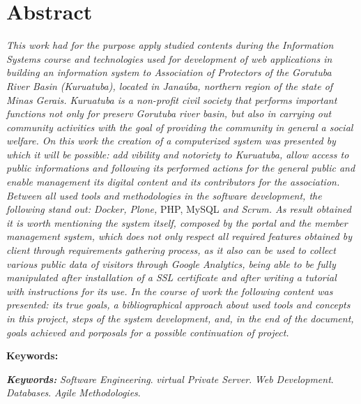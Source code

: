 \chapter*{Abstract}
\vspace{0.4cm}
\noindent \textit{This work had for  the purpose apply studied contents during the Information Systems course and technologies  used for development of web applications   in building an information system to Association of Protectors of the Gorutuba River Basin (Kuruatuba), located in Janaúba, northern region of the state of Minas Gerais. 
Kuruatuba is a 
non-profit civil society that performs important functions not only for preserv Gorutuba river basin, but also in carrying out community activities with the goal of providing the community in general a social welfare.
On this work the creation of a computerized system was presented by which it will be possible: add vibility and notoriety to Kuruatuba, allow access to public informations and following its performed actions for the general public and enable management its digital content and its contributors for the association.
Between all used tools and methodologies in the software development, the following stand out: Docker, Plone,} PHP, MySQL \textit{and Scrum.
As result obtained it is worth mentioning the system itself, composed by the portal and the member management system, which does not only respect all required features obtained by client through requirements gathering process, as it also can be used to collect various public data of visitors through Google Analytics, being able to be fully manipulated after installation of a SSL certificate and after writing a tutorial with instructions for its use.
In the course of work the following content was presented: its true goals, a bibliographical approach about used tools and concepts in this project, steps of the system development, and, in the end of the document, goals achieved and porposals for a possible continuation of project.}

\begin{labeling}{\textbf{Keywords:}}
\item[\textit{\textbf{Keywords:}}] 
\textit{Software Engineering}.
\textit{virtual Private Server}.
\textit{Web Development}.
\textit{Databases}.
\textit{Agile Methodologies}.
\end{labeling}
